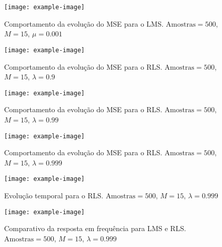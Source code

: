 \begin{figure}[!htp]
    \centering
    \texttt{[image: example-image]}
    \caption{Comportamento da evolução do MSE para o LMS. $\text{Amostras} = 500$, $M = 15$, $\mu = 0.001$}
    \label{fig:L4Q5_a1}
\end{figure}

\begin{figure}[!htp]
    \centering
    \texttt{[image: example-image]}
    \caption{Comportamento da evolução do MSE para o RLS. $\text{Amostras} = 500$, $M = 15$, $\lambda = 0.9$}
    \label{fig:L4Q5_a2}
\end{figure}

\begin{figure}[!htp]
    \centering
    \texttt{[image: example-image]}
    \caption{Comportamento da evolução do MSE para o RLS. $\text{Amostras} = 500$, $M = 15$, $\lambda = 0.99$}
    \label{fig:L4Q5_a3}
\end{figure}

\begin{figure}[!htp]
    \centering
    \texttt{[image: example-image]}
    \caption{Comportamento da evolução do MSE para o RLS. $\text{Amostras} = 500$, $M = 15$, $\lambda = 0.999$}
    \label{fig:L4Q5_a4}
\end{figure}

\begin{figure}[!htp]
    \centering
    \texttt{[image: example-image]}
    \caption{Evolução temporal para o RLS. $\text{Amostras} = 500$, $M = 15$, $\lambda = 0.999$}
    \label{fig:L4Q5_a5}
\end{figure}

\begin{figure}[!htp]
    \centering
    \texttt{[image: example-image]}
    \caption{Comparativo da resposta em frequência para LMS e RLS. $\text{Amostras} = 500$, $M = 15$, $\lambda = 0.999$}
    \label{fig:L4Q5_a6}
\end{figure}

